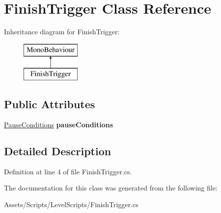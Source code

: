 \hypertarget{class_finish_trigger}{\section{Finish\+Trigger Class Reference}
\label{class_finish_trigger}
}
Inheritance diagram for Finish\+Trigger\+:\begin{figure}[H]
\begin{center}
\leavevmode
\includegraphics[height=2.000000cm]{class_finish_trigger}
\end{center}
\end{figure}
\subsection*{Public Attributes}
\begin{DoxyCompactItemize}
\item 
\hypertarget{class_finish_trigger_a334ae7510c004a5828689ba439bc3388}{\hyperlink{class_pause_conditions}{Pause\+Conditions} {\bfseries pause\+Conditions}}\label{class_finish_trigger_a334ae7510c004a5828689ba439bc3388}

\end{DoxyCompactItemize}


\subsection{Detailed Description}


Definition at line 4 of file Finish\+Trigger.\+cs.



The documentation for this class was generated from the following file\+:\begin{DoxyCompactItemize}
\item 
Assets/\+Scripts/\+Level\+Scripts/Finish\+Trigger.\+cs\end{DoxyCompactItemize}
